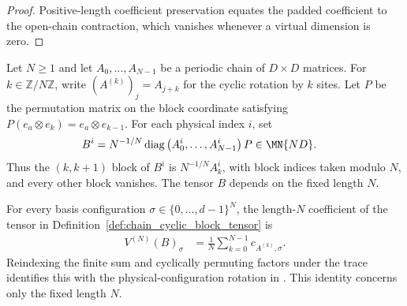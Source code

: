 \begin{proof}
    \leanok
    Positive-length coefficient preservation equates the padded coefficient to the open-chain contraction, which vanishes whenever a virtual dimension is zero.
\end{proof}
\begin{definition}
    \label{def:chain_cyclic_block_tensor}
    \leanok
    Let $N\geq 1$ and let $A_0,\ldots,A_{N-1}$ be a periodic chain of
    $D\times D$ matrices. For $k\in\mathbb Z/N\mathbb Z$, write
    $(A^{(k)})_j=A_{j+k}$ for the cyclic rotation by $k$ sites. Let $P$ be
    the permutation matrix on the block coordinate satisfying
    $P(e_a\otimes e_k)=e_a\otimes e_{k-1}$. For each physical index $i$, set
    \begin{align}
        B^i
         & =N^{-1/N}\operatorname{diag}
        \left(A_0^i,\ldots,A_{N-1}^i\right)P
        \in\MN{ND}.
        \label{eq:chain_cyclic_block_tensor}
    \end{align}
    Thus the $(k,k+1)$ block of $B^i$ is $N^{-1/N}A_k^i$, with block
    indices taken modulo $N$, and every other block vanishes. The tensor $B$
    depends on the fixed length $N$.
\end{definition}

\begin{lemma}
    \label{thm:chain_cyclic_block_average}
    \leanok
    For every basis configuration $\sigma\in\{0,\ldots,d-1\}^N$, the
    length-$N$ coefficient of the tensor in
    Definition~\ref{def:chain_cyclic_block_tensor} is
    \begin{align}
        V^{(N)}(B)_\sigma
         & =\frac{1}{N}\sum_{k=0}^{N-1}c_{A^{(k)},\sigma}.
        \label{eq:chain_cyclic_block_average}
    \end{align}
    Reindexing the finite sum and cyclically permuting factors under the trace
    identifies this with the physical-configuration rotation in
    \cite[Theorem~3]{PerezGarcia2007Matrix}. This identity concerns only the
    fixed length $N$.
\end{lemma}

